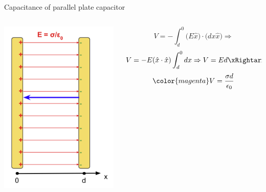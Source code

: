 \begin{frame}{Capacitance of parallel plate capacitor}
\begin{columns}
  \begin{column}{0.25\textwidth}
   \begin{center}
     \includegraphics[width=0.99\textwidth]{./images/schematics/parallel_plate_capacitor_path_integral.png}\\
   \end{center}
  \end{column}
  \begin{column}{0.75\textwidth}
    \begin{equation*}
       V = - \int_{d}^{0} \big( E \hat{x} \big) \cdot \Big( dx \hat{x} \Big) \Rightarrow
    \end{equation*}
    \begin{equation*}
      V = - E (\hat{x} \cdot \hat{x}) \int_{d}^{0} dx \Rightarrow
      V =  E d \xRightarrow{E = \frac{\sigma}{\epsilon_0}}
    \end{equation*}
    \begin{equation*}
       {\color{magenta} V =  \frac{\sigma d}{\epsilon_0} }
    \end{equation*}

  \end{column}
\end{columns}

\end{frame}

